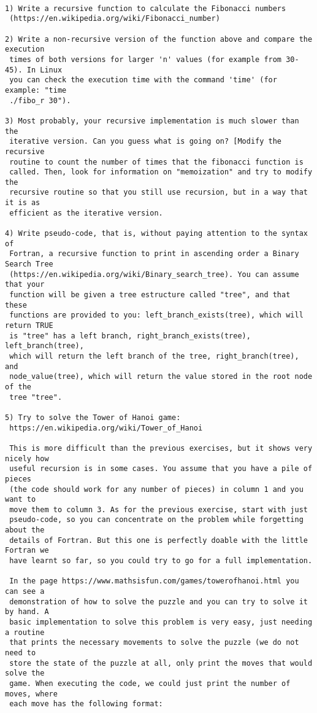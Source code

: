 \begin{verbatim}

1) Write a recursive function to calculate the Fibonacci numbers
 (https://en.wikipedia.org/wiki/Fibonacci_number)

2) Write a non-recursive version of the function above and compare the execution
 times of both versions for larger 'n' values (for example from 30-45). In Linux
 you can check the execution time with the command 'time' (for example: "time
 ./fibo_r 30").

3) Most probably, your recursive implementation is much slower than the
 iterative version. Can you guess what is going on? [Modify the recursive
 routine to count the number of times that the fibonacci function is
 called. Then, look for information on "memoization" and try to modify the
 recursive routine so that you still use recursion, but in a way that it is as
 efficient as the iterative version.

4) Write pseudo-code, that is, without paying attention to the syntax of
 Fortran, a recursive function to print in ascending order a Binary Search Tree
 (https://en.wikipedia.org/wiki/Binary_search_tree). You can assume that your
 function will be given a tree estructure called "tree", and that these
 functions are provided to you: left_branch_exists(tree), which will return TRUE
 is "tree" has a left branch, right_branch_exists(tree), left_branch(tree),
 which will return the left branch of the tree, right_branch(tree), and
 node_value(tree), which will return the value stored in the root node of the
 tree "tree".

5) Try to solve the Tower of Hanoi game:
 https://en.wikipedia.org/wiki/Tower_of_Hanoi

 This is more difficult than the previous exercises, but it shows very nicely how
 useful recursion is in some cases. You assume that you have a pile of pieces
 (the code should work for any number of pieces) in column 1 and you want to
 move them to column 3. As for the previous exercise, start with just
 pseudo-code, so you can concentrate on the problem while forgetting about the
 details of Fortran. But this one is perfectly doable with the little Fortran we
 have learnt so far, so you could try to go for a full implementation.

 In the page https://www.mathsisfun.com/games/towerofhanoi.html you can see a
 demonstration of how to solve the puzzle and you can try to solve it by hand. A
 basic implementation to solve this problem is very easy, just needing a routine
 that prints the necessary movements to solve the puzzle (we do not need to
 store the state of the puzzle at all, only print the moves that would solve the
 game. When executing the code, we could just print the number of moves, where
 each move has the following format:


\end{verbatim}
